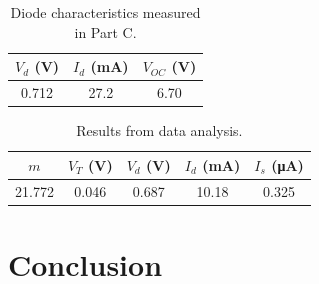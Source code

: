 \documentclass{article}
\begin{document}
%   

\begin{table}[hbtp]
  \centering
  \begin{tabular}{ccc}
    $V_d$ (\si{V}) & $I_d$ (\si{mA}) & $V_{OC}$ (\si{V}) \\
    \hline
    0.712 & 27.2 & 6.70 \\
  \end{tabular}
  \caption{\label{tab:part_c} Diode characteristics measured in Part C.}
\end{table}

\begin{table}[hbtp]
  \centering
  \begin{tabular}{ccccc}
    $m$ & $V_T$ (\si{V}) & $V_d$ (\si{V}) & $I_d$ (\si{mA}) & $I_s$ (\si{\micro\ampere}) \\
    \hline
    21.772 & 0.046 & 0.687 & 10.18 & 0.325 \\
  \end{tabular}
  \caption{\label{tab:analysis} Results from data analysis.}
\end{table}

\section{Conclusion}
\label{sec:conclusion}

\end{document}
